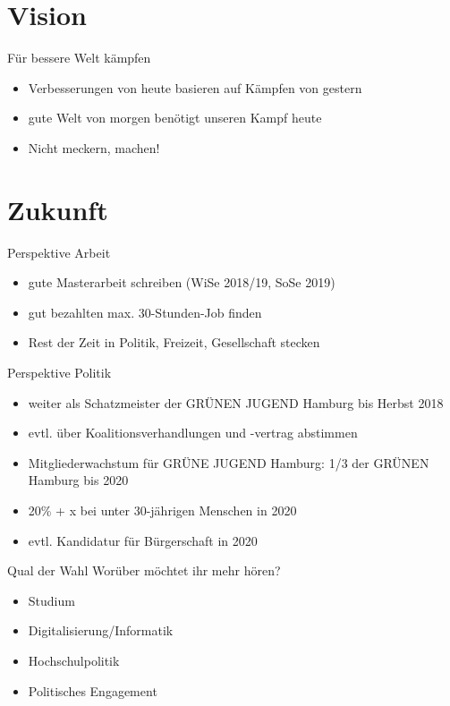 \documentclass{beamer}
\begin{document}
\section{Vision}
\begin{frame}{Für bessere Welt kämpfen}
    \begin{itemize}
        \item Verbesserungen von heute basieren auf Kämpfen von gestern
        \vfill
        \item gute Welt von morgen benötigt unseren Kampf heute
        \vfill
        \item Nicht meckern, machen!
    \end{itemize}
\end{frame}

\section{Zukunft}

\begin{frame}{Perspektive Arbeit}
    \begin{itemize}
        \item gute Masterarbeit schreiben (WiSe 2018/19, SoSe 2019)
        \vfill
        \item gut bezahlten max. 30-Stunden-Job finden
        \vfill
        \item Rest der Zeit in Politik, Freizeit, Gesellschaft stecken
    \end{itemize}
\end{frame}

\begin{frame}{Perspektive Politik}
    \begin{itemize}
        \item weiter als Schatzmeister der GRÜNEN JUGEND Hamburg bis Herbst 2018
        \vfill
        \item evtl. über Koalitionsverhandlungen und -vertrag abstimmen
        \vfill
        \item Mitgliederwachstum für GRÜNE JUGEND Hamburg:
              1/3 der GRÜNEN Hamburg bis 2020
        \vfill
        \item 20\% + x bei unter 30-jährigen Menschen in 2020
        \vfill
        \item evtl. Kandidatur für Bürgerschaft in 2020
    \end{itemize}
\end{frame}

\begin{frame}{Qual der Wahl}
    Worüber möchtet ihr mehr hören?
    \begin{itemize}
        \item Studium
        \vfill
        \item Digitalisierung/Informatik
        \vfill
        \item Hochschulpolitik
        \vfill
        \item Politisches Engagement
    \end{itemize}
\end{frame}
\end{document}
